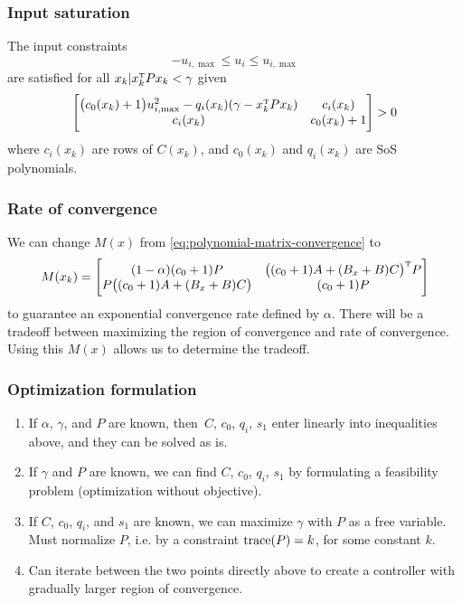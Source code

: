 \subsubsection{Input saturation}
The input constraints
%
\begin{equation}
  -u_{i,\max} \leq u_i \leq u_{i,\max}
\end{equation}
%
are satisfied for all $x_k | x_k\tp P x_k < \gamma$ given
\begin{equation}
  \begin{bmatrix}
    \big( c_0(x_k) + 1 \big)u_{i,\max}^2 - q_i(x_k)(\gamma - x_k\tp P x_k) & c_i(x_k) \\
    c_i(x_k) & c_0(x_k) + 1
  \end{bmatrix}
  > 0
\end{equation}
%
where
%
$c_i(x_k)$ are rows of $C(x_k)$, and $c_0(x_k)$ and $q_i(x_k)$ are SoS polynomials.

\subsubsection{Rate of convergence}
We can change $M(x)$ from \eqref{eq:polynomial-matrix-convergence} to
\begin{equation}
  M(x_k) =
  \begin{bmatrix}
    (1 - \alpha)(c_0 + 1) P & \big( (c_0 + 1)A + (B_x + B)C \big)\tp P \\
    P \big( (c_0 + 1)A + (B_x + B)C \big) & (c_0 + 1)P
  \end{bmatrix}
\end{equation}
to guarantee an exponential convergence rate defined by $\alpha$. There will be a tradeoff between maximizing the region of convergence and rate of convergence. Using this $M(x)$ allows us to determine the tradeoff.

\subsubsection{Optimization formulation}
\begin{enumerate}
  \item If $\alpha$, $\gamma$, and $P$ are known, then $C$, $c_0$, $q_i$, $s_1$ enter linearly into inequalities above, and they can be solved as is.
  \item If $\gamma$ and $P$ are known, we can find $C$, $c_0$, $q_i$, $s_1$ by formulating a feasibility problem (optimization without objective).
  \item If $C$, $c_0$, $q_i$, and $s_1$ are known, we can maximize $\gamma$ with $P$ as a free variable. Must normalize $P$, i.e. by a constraint $\operatorname{trace}(P) = k$, for some constant $k$.
  \item Can iterate between the two points directly above to create a controller with gradually larger region of convergence.
\end{enumerate}
